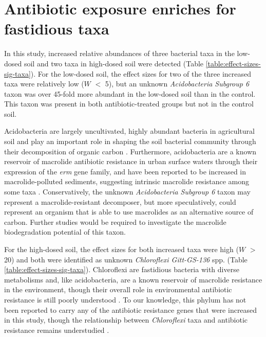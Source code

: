 \section{Antibiotic exposure enriches for fastidious taxa} \label{section:fastidious-taxa}

In this study, increased relative abundances of three bacterial taxa in the low-dosed soil and two taxa in high-dosed soil were detected (Table \ref{table:effect-sizes-sig-taxa}).
For the low-dosed soil, the effect sizes for two of the three increased taxa were relatively low ($W$ $<$ 5), but an unknown \textit{Acidobacteria Subgroup 6} taxon was over 45-fold more abundant in the low-dosed soil than in the control.
This taxon was present in both antibiotic-treated groups but not in the control soil.

Acidobacteria are largely uncultivated, highly abundant bacteria in agricultural soil and play an important role in shaping the soil bacterial community through their decomposition of organic carbon \parencite{Solden.2016, Banerjee.2016, Banerjee.2016b}.
Furthermore, acidobacteria are a known reservoir of macrolide antibiotic resistance in urban surface waters through their expression of the \textit{erm} gene family, and have been reported to be increased in macrolide-polluted sediments, suggesting intrinsic macrolide resistance among some taxa \parencite{Yi.2019, Milakovic.2020}.
Conservatively, the unknown \textit{Acidobacteria Subgroup 6} taxon may represent a macrolide-resistant decomposer, but more speculatively, could represent an organism that is able to use macrolides as an alternative source of carbon.
Further studies would be required to investigate the macrolide biodegradation potential of this taxon.

For the high-dosed soil, the effect sizes for both increased taxa were high ($W$ $>$ 20) and both were identified as unknown \textit{Chloroflexi Gitt-GS-136} spp. (Table \ref{table:effect-sizes-sig-taxa}).
Chloroflexi are fastidious bacteria with diverse metabolisms and, like acidobacteria, are a known reservoir of macrolide resistance in the environment, though their overall role in environmental antibiotic resistance is still poorly understood \parencite{Gupta.2013, Islam.2019, Yi.2019}.
To our knowledge, this phylum has not been reported to carry any of the antibiotic resistance genes that were increased in this study, though the relationship between \textit{Chloroflexi} taxa and antibiotic resistance remains understudied \parencite{Razavi.2017}.

